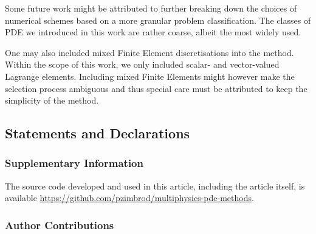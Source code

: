 \documentclass[sn-mathphys,Numbered]{sn-jnl}%
\theoremstyle{thmstyleone}%
\theoremstyle{thmstyletwo}%
\theoremstyle{thmstylethree}%
\begin{document}
Some future work might be attributed to further breaking down the choices of numerical schemes based on a more granular problem classification.
The classes of PDE we introduced in this work are rather coarse, albeit the most widely used.

One may also included mixed Finite Element discretisations into the method.
Within the scope of this work, we only included scalar- and vector-valued Lagrange elements.
Including mixed Finite Elements might however make the selection process ambiguous and thus special care must be attributed to keep the simplicity of the method.

\begin{appendices}




\subsection*{Statements and Declarations}

\subsubsection*{Supplementary Information}

The source code developed and used in this article, including the article itself, is available \url{https://github.com/pzimbrod/multiphysics-pde-methods}.

\subsubsection*{Author Contributions}


\end{appendices}
\end{document}
